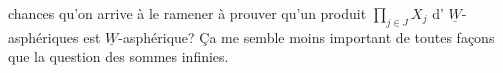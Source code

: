 chances qu'on arrive à le ramener à prouver qu'un produit $\prod_{j\in J}X_j$ d' $\underline W$-asphériques est $\underline W$-asphérique? Ça me semble moins important de toutes façons que la question des sommes infinies.


